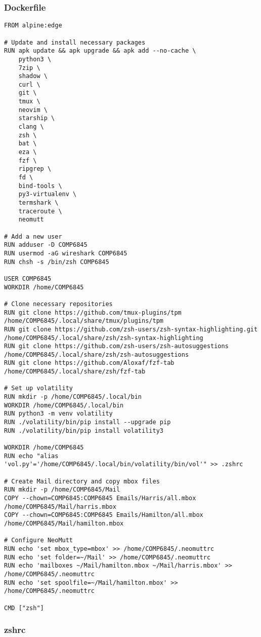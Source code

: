 \subsubsection{Dockerfile}
\label{subsubsec:Dockerfile}
\begin{verbatim}
FROM alpine:edge

# Update and install necessary packages
RUN apk update && apk upgrade && apk add --no-cache \
    python3 \
    7zip \
    shadow \
    curl \
    git \
    tmux \
    neovim \
    starship \
    clang \
    zsh \
    bat \
    eza \
    fzf \
    ripgrep \
    fd \
    bind-tools \
    py3-virtualenv \
    termshark \
    traceroute \
    neomutt

# Add a new user
RUN adduser -D COMP6845
RUN usermod -aG wireshark COMP6845
RUN chsh -s /bin/zsh COMP6845

USER COMP6845
WORKDIR /home/COMP6845

# Clone necessary repositories
RUN git clone https://github.com/tmux-plugins/tpm /home/COMP6845/.local/share/tmux/plugins/tpm
RUN git clone https://github.com/zsh-users/zsh-syntax-highlighting.git /home/COMP6845/.local/share/zsh/zsh-syntax-highlighting
RUN git clone https://github.com/zsh-users/zsh-autosuggestions /home/COMP6845/.local/share/zsh/zsh-autosuggestions
RUN git clone https://github.com/Aloxaf/fzf-tab /home/COMP6845/.local/share/zsh/fzf-tab

# Set up volatility
RUN mkdir -p /home/COMP6845/.local/bin
WORKDIR /home/COMP6845/.local/bin
RUN python3 -m venv volatility
RUN ./volatility/bin/pip install --upgrade pip
RUN ./volatility/bin/pip install volatility3

WORKDIR /home/COMP6845
RUN echo "alias 'vol.py'='/home/COMP6845/.local/bin/volatility/bin/vol'" >> .zshrc

# Create Mail directory and copy mbox files
RUN mkdir -p /home/COMP6845/Mail
COPY --chown=COMP6845:COMP6845 Emails/Harris/all.mbox /home/COMP6845/Mail/harris.mbox
COPY --chown=COMP6845:COMP6845 Emails/Hamilton/all.mbox /home/COMP6845/Mail/hamilton.mbox

# Configure NeoMutt
RUN echo 'set mbox_type=mbox' >> /home/COMP6845/.neomuttrc
RUN echo 'set folder=~/Mail' >> /home/COMP6845/.neomuttrc
RUN echo 'mailboxes ~/Mail/hamilton.mbox ~/Mail/harris.mbox' >> /home/COMP6845/.neomuttrc
RUN echo 'set spoolfile=~/Mail/hamilton.mbox' >> /home/COMP6845/.neomuttrc

CMD ["zsh"]
\end{verbatim}

\subsubsection{zshrc}
\label{subsubsec:zshrc}

